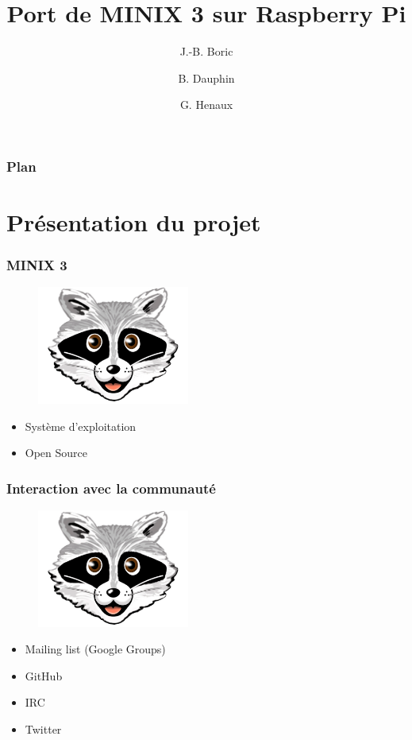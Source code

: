 \documentclass{beamer}
\begin{document}
\title{Port de MINIX 3 sur Raspberry Pi}
\author{J.-B. Boric \and B. Dauphin \and G. Henaux}
\maketitle

\begin{frame}
\frametitle{Plan}
\tableofcontents
\end{frame}

\section{Présentation du projet}

\begin{frame}
\frametitle{MINIX 3}
\begin{figure}[center]
\includegraphics[width=5cm,natwidth=696,natheight=540]{minix3.png}
\end{figure}
\begin{itemize}
\item Système d'exploitation
\item Open Source
\end{itemize}
\end{frame}

\begin{frame}
\frametitle{Interaction avec la communauté}
\begin{figure}[center]
\includegraphics[width=5cm,natwidth=696,natheight=540]{minix3.png}
\end{figure}
\begin{itemize}
\item Mailing list (Google Groups)
\item GitHub
\item IRC
\item Twitter
\end{itemize}
\end{frame}
\end{document}
